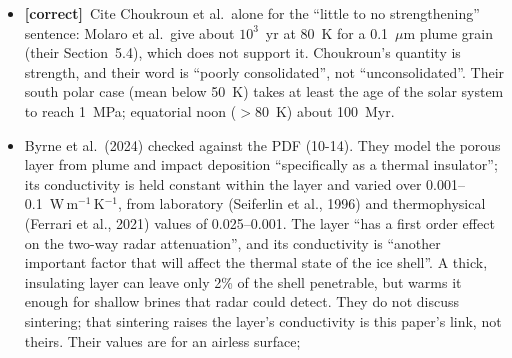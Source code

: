 \documentclass[11pt]{article}
\newcommand{\tC}{\textcolor{miss}{\textbf{[correct]}}\ }
\begin{document}
\begin{enumerate}
\begin{itemize}
    Choukroun et al.\ (2020) sintered analogs of plume deposits and found
    that their strength grows linearly in time, at a rate following an
    Arrhenius law with an activation energy of $24.3 \pm 3.3$~kJ\,mol$^{-1}$.
    Extrapolated to Enceladus, little to no strengthening is expected under
    typical surface conditions, and deposits remain poorly consolidated.
    Near the Tiger Stripes, where temperatures may reach 180~K (Spencer \&
    Nimmo, 2013), the same deposits become very consolidated within about
    15~years (Choukroun et al., 2020). These are also the regions of
    heaviest fallout, 0.01--1~mm\,yr$^{-1}$ (Kempf et al., 2010; Southworth
    et al., 2019), so fresh grains bury a deposit while it sinters, and the
    rate of sintering matters as much as its end state. Sintering that
    strengthens a deposit also changes its other bulk properties, among
    them its thermal conductivity. A porous surface layer insulates the ice
    shell beneath it, and its conductivity, which Byrne et al.\ (2024)
    varied from 0.001 to 0.1~W\,m$^{-1}$\,K$^{-1}$ to span measured and
    modelled values, sets the temperature of the shell and with it how deep
    a radar sounder can see.''
  \item \tC Cite Choukroun et al.\ alone for the ``little to no
    strengthening'' sentence: Molaro et al.\ give about $10^3$~yr at 80~K
    for a 0.1~$\mu$m plume grain (their Section~5.4), which does not support
    it. Choukroun's quantity is strength, and their word is ``poorly
    consolidated'', not ``unconsolidated''. Their south polar case (mean
    below 50~K) takes at least the age of the solar system to reach 1~MPa;
    equatorial noon ($>80$~K) about 100~Myr.
  \item Byrne et al.\ (2024) checked against the PDF (10-14). They model
    the porous layer from plume and impact deposition ``specifically as a
    thermal insulator''; its conductivity is held constant within the layer
    and varied over 0.001--0.1~W\,m$^{-1}$\,K$^{-1}$, from laboratory
    (Seiferlin et al., 1996) and thermophysical (Ferrari et al., 2021)
    values of 0.025--0.001. The layer ``has a first order effect on the
    two-way radar attenuation'', and its conductivity is ``another important
    factor that will affect the thermal state of the ice shell''. A thick,
    insulating layer can leave only 2\% of the shell penetrable, but warms
    it enough for shallow brines that radar could detect. They do not
    discuss sintering; that sintering raises the layer's conductivity is
    this paper's link, not theirs. Their values are for an airless surface;

\end{itemize}
\end{enumerate}
\end{document}
